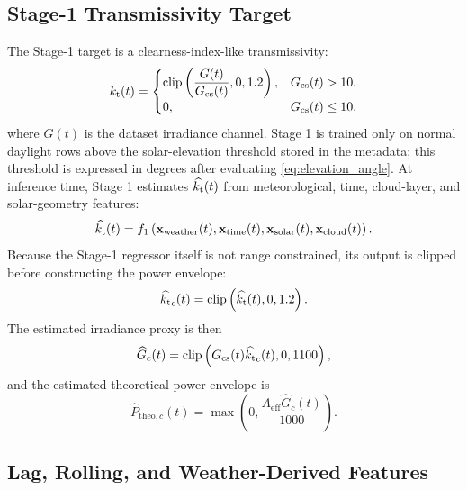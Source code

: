 \subsection{Stage-1 Transmissivity Target}

The Stage-1 target is a clearness-index-like transmissivity:
\begin{equation}
k_{\mathrm{t}}(t)=
\begin{cases}
\mathrm{clip}\left(\dfrac{G(t)}{G_{\mathrm{cs}}(t)},0,1.2\right), & G_{\mathrm{cs}}(t)>10,\\
0, & G_{\mathrm{cs}}(t)\leq 10,
\end{cases}
\label{eq:kt}
\end{equation}
where $G(t)$ is the dataset irradiance channel. Stage 1 is trained only on normal daylight rows above the solar-elevation threshold stored in the metadata; this threshold is expressed in degrees after evaluating \eqref{eq:elevation_angle}. At inference time, Stage 1 estimates $\widehat{k_{\mathrm{t}}}(t)$ from meteorological, time, cloud-layer, and solar-geometry features:
\begin{equation}
\widehat{k_{\mathrm{t}}}(t)=f_1\left(\mathbf{x}_{\mathrm{weather}}(t),
\mathbf{x}_{\mathrm{time}}(t),\mathbf{x}_{\mathrm{solar}}(t),
\mathbf{x}_{\mathrm{cloud}}(t)\right).
\label{eq:stage1}
\end{equation}
Because the Stage-1 regressor itself is not range constrained, its output is clipped before constructing the power envelope:
\begin{equation}
\widehat{k_{\mathrm{t}}}_{c}(t)=\mathrm{clip}\left(\widehat{k_{\mathrm{t}}}(t),0,1.2\right).
\label{eq:kt_clip}
\end{equation}
The estimated irradiance proxy is then
\begin{equation}
\widehat{G}_{c}(t)=\mathrm{clip}\left(G_{\mathrm{cs}}(t)\widehat{k_{\mathrm{t}}}_{c}(t),0,1100\right),
\label{eq:irr_est}
\end{equation}
and the estimated theoretical power envelope is
\begin{equation}
\widehat{P}_{\mathrm{theo},c}(t)=
\max\left(0,\frac{A_{\mathrm{eff}}\widehat{G}_{c}(t)}{1000}\right).
\label{eq:theo_est}
\end{equation}

\subsection{Lag, Rolling, and Weather-Derived Features}

